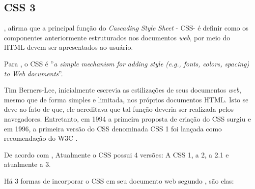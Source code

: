 \subsection{CSS 3}

, afirma que a principal função do \textit{Cascading Style Sheet} - CSS\footnotemark[25] - é definir como os componentes anteriormente estruturados nos documentos \textit{web}, por meio do HTML devem ser apresentados ao usuário.


Para , o CSS é ''\textit{a simple mechanism for adding style (e.g., fonts, colors, spacing) to Web documents}\footnotemark[26]''.


Tim Berners-Lee, inicialmente escrevia as estilizações de seus documentos \textit{web}, mesmo que de forma simples e limitada, nos próprios documentos HTML. Isto se deve ao fato de que, ele acreditava que tal função deveria ser realizada pelos navegadores. Entretanto, em 1994 a primeira proposta de criação do CSS surgiu e em 1996, a primeira versão do CSS denominada CSS 1 foi lançada como recomendação do W3C \cite{silva_css_3}.

De acordo com , Atualmente o CSS possui 4 versões: A CSS 1, a 2, a 2.1 e atualmente a 3.


Há 3 formas de incorporar o CSS em seu documento web segundo \cite{silva_css_3}, são elas: 

